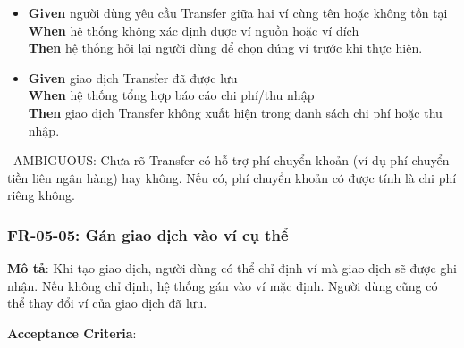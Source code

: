 \begin{itemize}
\item \textbf{Given} người dùng yêu cầu Transfer giữa hai ví cùng tên hoặc không tồn tại  \\ \hspace*{1.5em}  \textbf{When} hệ thống không xác định được ví nguồn hoặc ví đích  \\ \hspace*{1.5em}  \textbf{Then} hệ thống hỏi lại người dùng để chọn đúng ví trước khi thực hiện.
\item \textbf{Given} giao dịch Transfer đã được lưu  \\ \hspace*{1.5em}  \textbf{When} hệ thống tổng hợp báo cáo chi phí/thu nhập  \\ \hspace*{1.5em}  \textbf{Then} giao dịch Transfer không xuất hiện trong danh sách chi phí hoặc thu nhập.
\end{itemize}
\warningicon\  AMBIGUOUS: Chưa rõ Transfer có hỗ trợ phí chuyển khoản (ví dụ phí chuyển tiền liên ngân hàng) hay không. Nếu có, phí chuyển khoản có được tính là chi phí riêng không.



\subsubsection{FR-05-05: Gán giao dịch vào ví cụ thể}

\textbf{Mô tả}: Khi tạo giao dịch, người dùng có thể chỉ định ví mà giao dịch sẽ được ghi nhận. Nếu không chỉ định, hệ thống gán vào ví mặc định. Người dùng cũng có thể thay đổi ví của giao dịch đã lưu.



\textbf{Acceptance Criteria}:

